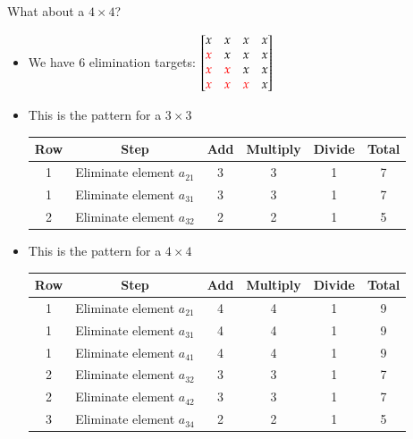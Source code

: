 \documentclass[10pt]{beamer}
\begin{document}
\begin{frame}[shrink]{What about a $4\times4$?}

\begin{itemize}
    \item We have 6 elimination targets: 
    $
    \begin{bmatrix}
        x & x & x & x  \\
        \textcolor{red}{x} & x & x & x  \\
        \textcolor{red}{x} & \textcolor{red}{x}  & x & x  \\
        \textcolor{red}{x} & \textcolor{red}{x}  & \textcolor{red}{x}  & x 
    \end{bmatrix}
    $
    
    \item This is the pattern for a $3\times 3$
\begin{center}
\begin{tabular}{c c c c c c}\hline
 Row & Step & Add & Multiply & Divide & Total \\\hline
 1 &  Eliminate element $a_{21}$ & 3 & 3& 1 & 7\\
 1 &  Eliminate element $a_{31}$ & 3 & 3& 1 & 7\\
 2 &  Eliminate element $a_{32}$ & 2 & 2 & 1 & 5\\\hline
\end{tabular}
\vspace{1em}
\end{center}
\item<2>  This is the pattern for a $4\times 4$
\begin{center}
\begin{tabular}{c c c c c c}\hline
 Row & Step & Add & Multiply & Divide & Total \\\hline
 1 &  Eliminate element $a_{21}$ & 4 & 4& 1 & 9\\
 1 &  Eliminate element $a_{31}$ & 4 & 4& 1 & 9\\
 1 &  Eliminate element $a_{41}$ & 4 & 4& 1 & 9\\
 2 &  Eliminate element $a_{32}$ & 3 & 3 & 1 & 7\\
 2 &  Eliminate element $a_{42}$ & 3 & 3 & 1 & 7\\
 3 &  Eliminate element $a_{34}$ & 2 & 2 & 1 & 5\\\hline
\end{tabular}
\end{center}
\end{itemize}
\end{frame}
\end{document}

